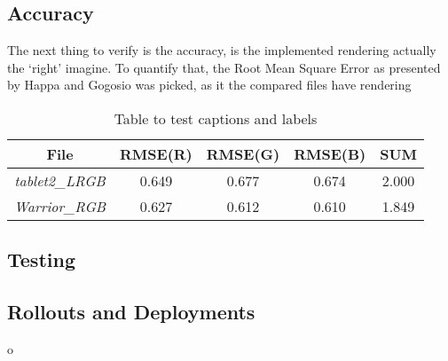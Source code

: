 \subsection{Accuracy}
The next thing to verify is the accuracy, is the implemented rendering actually
the `right' imagine. To quantify that, the Root Mean Square Error as presented
by Happa and Gogosio\cite*{gogioso_pbr:_2017} was picked, as it the compared
files have
rendering
\begin{table}[H]
\centering
\begin{tabular}{|c |  c c c | c|}
 \hline
 File & RMSE(R) & RMSE(G) & RMSE(B) & SUM  \\
  \hline
  \emph{tablet2\_LRGB} & 0.649 & 0.677 & 0.674  & 2.000 \\
  \emph{Warrior\_RGB} &0.627 & 0.612 & 0.610 & 1.849  \\
 \hline
\end{tabular}
\caption{Table to test captions and labels}
\label{table_Accuracy}
\end{table}

\subsection{Testing}

\subsection{Rollouts and Deployments}
o